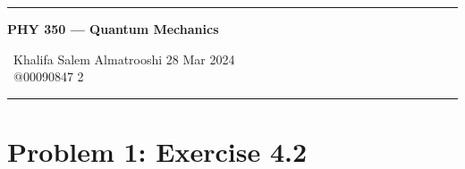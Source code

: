 \documentclass{article}
\begin{document}
	
	\begin{center}
		\hrule
		\vspace{0.4cm}
		\textbf { \Large PHY 350 --- Quantum Mechanics}
		\vspace{0.4cm}
	\end{center}
		 \ Khalifa Salem Almatrooshi \hspace{\fill}  28 Mar 2024 \\
		 \ @00090847 \hspace{\fill}  2 \\
		\hrule	
	
	\section*{Problem 1: Exercise 4.2}
	
\end{document}
